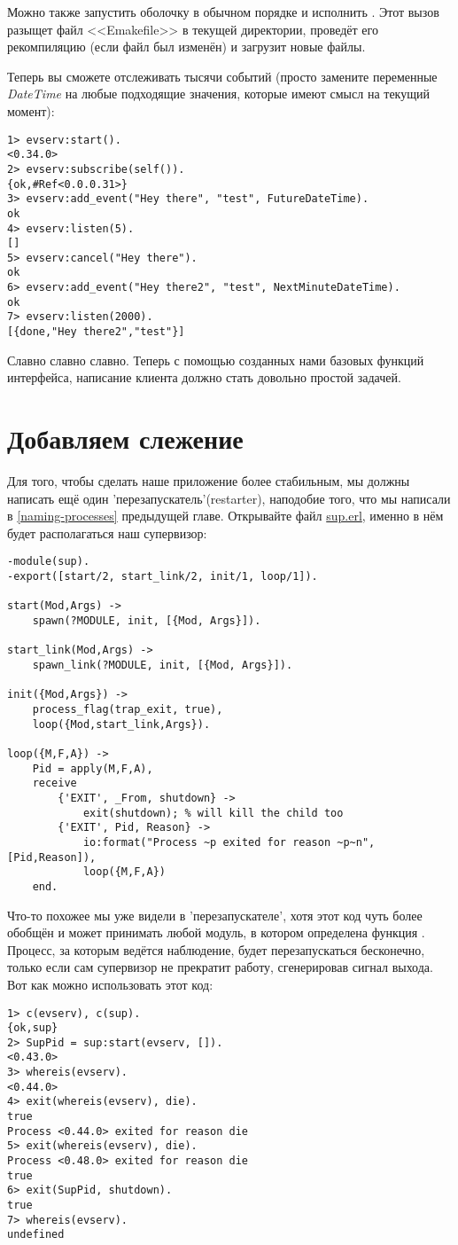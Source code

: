 Можно также запустить оболочку в обычном порядке и исполнить .
Этот вызов разыщет файл <<Emakefile>> в текущей директории, проведёт его рекомпиляцию (если файл был изменён) и загрузит новые файлы.

Теперь вы сможете отслеживать тысячи событий (просто замените переменные \emph{DateTime} на любые подходящие значения, которые имеют смысл на текущий момент): 
\begin{lstlisting}[style=erlang]
1> evserv:start().
<0.34.0>
2> evserv:subscribe(self()).
{ok,#Ref<0.0.0.31>}
3> evserv:add_event("Hey there", "test", FutureDateTime).
ok
4> evserv:listen(5).
[]
5> evserv:cancel("Hey there").
ok
6> evserv:add_event("Hey there2", "test", NextMinuteDateTime).
ok
7> evserv:listen(2000).
[{done,"Hey there2","test"}]
\end{lstlisting}

Славно славно славно.
Теперь с помощью созданных нами базовых функций интерфейса, написание клиента должно стать довольно простой задачей.
\section{Добавляем слежение}
\label{adding-supervision}
Для того, чтобы сделать наше приложение более стабильным, мы должны написать ещё один 'перезапускатель'(restarter), наподобие того, что мы написали в \ref{naming-processes} предыдущей главе.
Открывайте файл \href{http://learnyousomeerlang.com/static/erlang/sup.erl}{sup.erl}, именно в нём будет располагаться наш супервизор:
\begin{lstlisting}[style=erlang]
-module(sup).
-export([start/2, start_link/2, init/1, loop/1]).
 
start(Mod,Args) ->
    spawn(?MODULE, init, [{Mod, Args}]).
 
start_link(Mod,Args) ->
    spawn_link(?MODULE, init, [{Mod, Args}]).
 
init({Mod,Args}) ->
    process_flag(trap_exit, true),
    loop({Mod,start_link,Args}).
 
loop({M,F,A}) ->
    Pid = apply(M,F,A),
    receive
        {'EXIT', _From, shutdown} ->
            exit(shutdown); % will kill the child too
        {'EXIT', Pid, Reason} ->
            io:format("Process ~p exited for reason ~p~n",[Pid,Reason]),
            loop({M,F,A})
    end.
\end{lstlisting}

Что\--то похожее мы уже видели в 'перезапускателе', хотя этот код чуть более обобщён и может принимать любой модуль, в котором определена функция .
Процесс, за которым ведётся наблюдение, будет перезапускаться бесконечно, только если сам супервизор не прекратит работу, сгенерировав сигнал выхода.
Вот как можно использовать этот код:
\begin{lstlisting}[style=erlang]
1> c(evserv), c(sup).
{ok,sup}
2> SupPid = sup:start(evserv, []).
<0.43.0>
3> whereis(evserv).
<0.44.0>
4> exit(whereis(evserv), die).
true
Process <0.44.0> exited for reason die
5> exit(whereis(evserv), die).
Process <0.48.0> exited for reason die
true
6> exit(SupPid, shutdown).
true
7> whereis(evserv).
undefined
\end{lstlisting}

